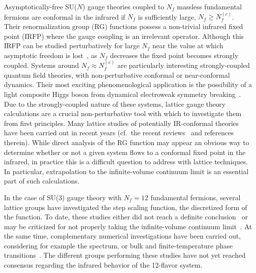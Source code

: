 
Asymptotically-free SU($N$) gauge theories coupled to $N_f$ massless fundamental fermions are conformal in the infrared if $N_f$ is sufficiently large, $N_f \geq N_f^{(c)}$.
Their renormalization group (RG) \be functions possess a non-trivial infrared fixed point (IRFP) where the gauge coupling is an irrelevant operator.
Although this IRFP can be studied perturbatively for large $N_f$ near the value at which asymptotic freedom is lost~\cite{Caswell:1974gg, Banks:1981nn}, as $N_f$ decreases the fixed point becomes strongly coupled.
Systems around $N_f \approx N_f^{(c)}$ are particularly interesting strongly-coupled quantum field theories, with non-perturbative conformal or near-conformal dynamics.
Their most exciting phenomenological application is the possibility of a light composite Higgs boson from dynamical electroweak symmetry breaking~\cite{Fodor:2012ty, Matsuzaki:2012xx, Appelquist:2013sia, Fodor:2014pqa, Aoki:2014oha}.
Due to the strongly-coupled nature of these systems, lattice gauge theory calculations are a crucial non-perturbative tool with which to investigate them from first principles.
Many lattice studies of potentially IR-conformal theories have been carried out in recent years (cf.~the recent reviews~\cite{Neil:2012cb, Giedt:2012it} and references therein).
While direct analysis of the RG \be function may appear an obvious way to determine whether or not a given system flows to a conformal fixed point in the infrared, in practice this is a difficult question to address with lattice techniques.
In particular, extrapolation to the infinite-volume continuum limit is an essential part of such calculations.

In the case of SU(3) gauge theory with $N_f = 12$ fundamental fermions, several lattice groups have investigated the step scaling function, the discretized form of the \be function.
To date, these studies either did not reach a definite conclusion~\cite{Hasenfratz:2010fi, Lin:2012iw} or may be criticized for not properly taking the infinite-volume continuum limit~\cite{Appelquist:2007hu, Appelquist:2009ty, Hasenfratz:2010fi, Hasenfratz:2011xn, Itou:2012qn, Petropoulos:2013gaa}.
At the same time, complementary numerical investigations have been carried out, considering for example the spectrum, or bulk and finite-temperature phase transitions~\cite{Deuzeman:2009mh, Fodor:2011tu, Appelquist:2011dp, DeGrand:2011cu, Cheng:2011ic, Cheng:2013eu, Fodor:2012uw, Fodor:2012et, Aoki:2012eq, Aoki:2013zsa, Jin:2012dw}.
The different groups performing these studies have not yet reached consensus regarding the infrared behavior of the 12-flavor system.

